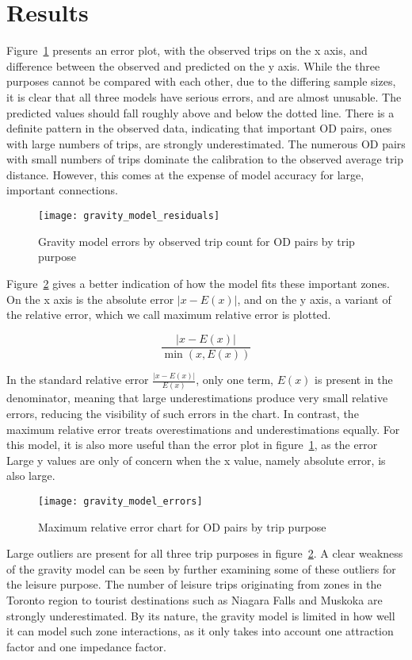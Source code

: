 \section{Results}
Figure~\ref{fig:gravity-residuals} presents an error plot, with the observed trips on the x axis, and difference between the observed and predicted on the y axis. While the three purposes cannot be compared with each other, due to the differing sample sizes, it is clear that all three models have serious errors, and are almost unusable. The predicted values should fall roughly above and below the dotted line. There is a definite pattern in the observed data, indicating that important OD pairs, ones with large numbers of trips, are strongly underestimated. The numerous OD pairs with small numbers of trips dominate the calibration to the observed average trip distance. However, this comes at the expense of model accuracy for large, important connections.

\begin{figure}[H]
\centering
\texttt{[image: gravity\_model\_residuals]}
\caption{Gravity model errors by observed trip count for OD pairs by trip purpose}
\label{fig:gravity-residuals}
\end{figure}

Figure~\ref{fig:gravity-errors} gives a better indication of how the model fits these important zones. On the x axis is the absolute error $|x - E(x)|$, and on the y axis, a variant of the relative error, which we call maximum relative error is plotted. 

$$\frac{|x-E(x)|}{\min(x, E(x))}$$

In the standard relative error $\frac{|x-E(x)|}{E(x)}$, only one term, $E(x)$ is present in the denominator, meaning that large underestimations produce very small relative errors, reducing the visibility of such errors in the chart. In contrast, the maximum relative error treats overestimations and underestimations equally. For this model, it is also more useful than the error plot in figure~\ref{fig:gravity-residuals}, as the error Large y values are only of concern when the x value, namely absolute error, is also large.

\begin{figure}[H]
\centering
\texttt{[image: gravity\_model\_errors]}
\caption{Maximum relative error chart for OD pairs by trip purpose}
\label{fig:gravity-errors}
\end{figure}

Large outliers are present for all three trip purposes in figure~\ref{fig:gravity-errors}. A clear weakness of the gravity model can be seen by further examining some of these outliers for the leisure purpose. The number of leisure trips originating from zones in the Toronto region to tourist destinations such as Niagara Falls and Muskoka are strongly underestimated. By its nature, the gravity model is limited in how well it can model such zone interactions, as it only takes into account one attraction factor and one impedance factor.

